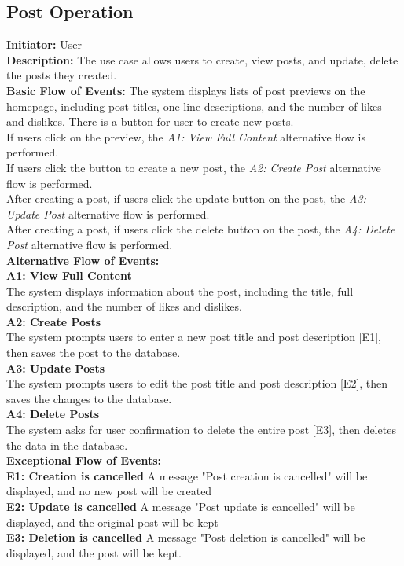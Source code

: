 \documentclass[a4paper,11pt]{scrreprt}
\begin{document}
\subsection{Post Operation}
\textbf{\large Initiator: }User\\
\textbf{\large Description: }The use case allows users to create, view posts, and update, delete the posts they created.\\
\textbf{\large Basic Flow of Events: }The system displays lists of post previews on the homepage, including post titles, one-line descriptions, and the number of likes and dislikes. There is a button for user to create new posts.\\
If users click on the preview, the \textit{A1: View Full Content} alternative flow is performed.\\
If users click the button to create a new post, the \textit{A2: Create Post} alternative flow is performed.\\
After creating a post, if users click the update button on the post, the \textit{A3: Update Post} alternative flow is performed.\\
After creating a post, if users click the delete button on the post, the \textit{A4: Delete Post} alternative flow is performed.\\
\textbf{\large Alternative Flow of Events: }\\
\textbf{A1: View Full Content}\\
The system displays information about the post, including the title, full description, and the number of likes and dislikes.\\
\textbf{A2: Create Posts}\\
The system prompts users to enter a new post title and post description [E1], then saves the post to the database.\\
\textbf{A3: Update Posts}\\
The system prompts users to edit the post title and post description [E2], then saves the changes to the database.\\
\textbf{A4: Delete Posts}\\
The system asks for user confirmation to delete the entire post [E3], then deletes the data in the database.\\
\textbf{\large Exceptional Flow of Events:}\\
\textbf{E1: Creation is cancelled } A message "Post creation is cancelled" will be displayed, and no new post will be created\\
\textbf{E2: Update is cancelled } A message "Post update is cancelled" will be displayed, and the original post will be kept\\
\textbf{E3: Deletion is cancelled } A message "Post deletion is cancelled" will be displayed, and the post will be kept.\\
\end{document}
